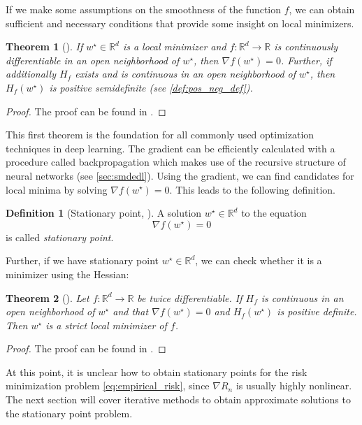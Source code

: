 \documentclass[12pt]{article}
\newtheorem{theorem}{Theorem}[section]
\theoremstyle{definition}
\newtheorem{definition}[definition]{Definition}
\numberwithin{equation}{section}
\newcommand{\R}{\mathbb{R}}
\begin{document}
If we make some assumptions on the smoothness of the function $f$, we can obtain sufficient and necessary conditions that provide some insight on local minimizers.
\begin{theorem}[]
  \label{thm:necessary_condition}
  If $w^\star \in \R^d$ is a local minimizer and $f:\R^d \rightarrow \R$ is continuously differentiable in an open neighborhood of $w^\star$, then $\nabla f(w^\star) = 0$. Further, if additionally $H_f$ exists and is continuous in an open neighborhood of $w^\star$, then $H_f(w^\star)$ is positive semidefinite (see \autoref{def:pos_neg_def}).
\end{theorem}
\begin{proof}
  The proof can be found in \autocite{nocedalNumericalOptimization2006}.
\end{proof}
This first theorem is the foundation for all commonly used optimization techniques in deep learning. The gradient can be  efficiently calculated with a procedure called backpropagation which makes use of the recursive structure of neural networks (see \autoref{sec:smdedl}). 
Using the gradient, we can find candidates for local minima by solving $\nabla f(w^\star) = 0$. This leads to the following definition.
\begin{definition}[Stationary point, ]
  A solution $w^\star \in \R^d$ to the equation
  \begin{equation}
  \label{eq:StationaryPoint}
    \nabla f(w^\star) = 0
  \end{equation}
  is called \emph{stationary point}.
\end{definition}
Further, if we have stationary point $w^\star \in \R^d$, we can check whether it is a minimizer using the Hessian:
\begin{theorem}[]
  Let $f:\R^d \rightarrow \R$ be twice differentiable. If $H_f$ is continuous in an open neighborhood of $w^\star$ and that $\nabla f(w^\star) = 0$ and $H_f(w^\star)$ is positive definite. Then $w^\star$ is a strict local minimizer of $f$.
\end{theorem}
\begin{proof}
  The proof can be found in \cite[pp.~16]{nocedalNumericalOptimization2006}.
\end{proof}

At this point, it is unclear how to obtain stationary points for the risk minimization problem \eqref{eq:empirical_risk}, since $\nabla R_n$ is usually highly nonlinear. The next section will cover iterative methods to obtain approximate solutions to the stationary point problem.
\end{document}

